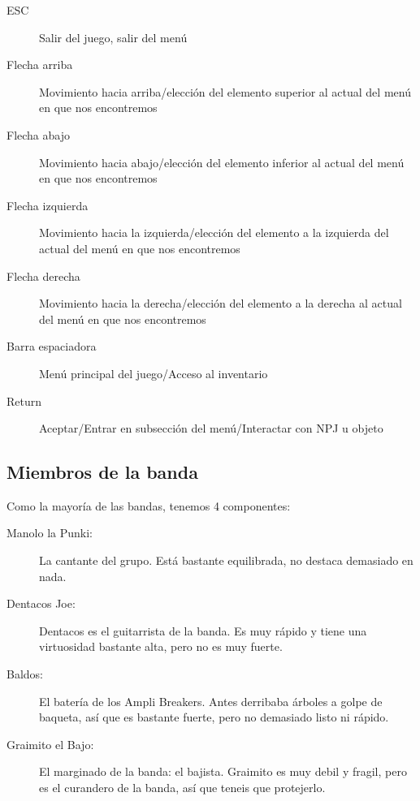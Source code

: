 \begin{description}
\item[ESC] Salir del juego, salir del menú
\item[Flecha arriba] Movimiento hacia arriba/elección del elemento superior 
  al actual del menú en que nos encontremos
\item[Flecha abajo] Movimiento hacia abajo/elección del elemento inferior 
  al actual del menú en que nos encontremos
\item[Flecha izquierda] Movimiento hacia la izquierda/elección del elemento 
  a la izquierda del actual del menú en que nos encontremos
\item[Flecha derecha]	Movimiento hacia la derecha/elección del elemento a 
  la derecha al actual del menú en que nos encontremos
\item[Barra espaciadora] Menú principal del juego/Acceso al inventario
\item[Return]	Aceptar/Entrar en subsección del menú/Interactar con NPJ 
  u objeto
\end{description}

\subsection{Miembros de la banda}

Como la mayoría de las bandas, tenemos 4 componentes:

\begin{description}
\item[Manolo la Punki: ] La cantante del grupo. Está bastante equilibrada, no
  destaca demasiado en nada.
\item[Dentacos Joe: ] Dentacos es el guitarrista de la banda. Es muy rápido 
  y tiene una virtuosidad bastante alta, pero no es muy fuerte.
\item[Baldos: ] El batería de los Ampli Breakers. Antes derribaba árboles
  a golpe de baqueta, así que es bastante fuerte, pero no demasiado listo
  ni rápido.
\item[Graimito el Bajo: ] El marginado de la banda: el bajista. Graimito es
  muy debil y fragil, pero es el curandero de la banda, así que teneis
  que protejerlo.
\end{description}
